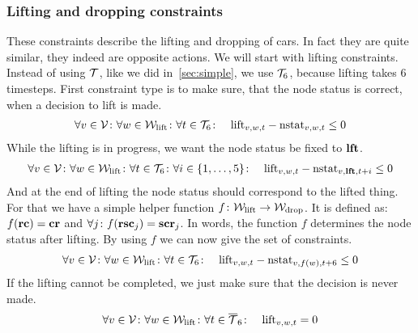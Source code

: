\subsubsection{Lifting and dropping constraints}
These constraints describe the lifting and dropping of cars. In fact they are
quite similar, they indeed are opposite actions. We will start with lifting
constraints. Instead of using $\mathcal{T}$, like we did in~\autoref{sec:simple}, we use
$\mathcal{T}_6$, because lifting takes 6 timesteps. First constraint type is to make sure,
that the node status is correct, when a decision to lift is made.
\begin{align}
    &\forall v \in \mathcal{V} \colon \forall w \in \mathcal{W}_\mathrm{lift} \colon \forall t \in \mathcal{T}_6 \colon
    &\mathrm{lift}_{v,w,t} - \mathrm{nstat}_{v,w,t} \leq 0
\end{align}
While the lifting is in progress, we want the node status be fixed to
$\text{\bf lft}$.
\begin{align}
    &\forall v \in \mathcal{V} \colon \forall w \in \mathcal{W}_\mathrm{lift} \colon \forall t \in \mathcal{T}_6 \colon
    \forall i \in \{1,\ldots,5\} \colon &\mathrm{lift}_{v,w,t} -
    \mathrm{nstat}_{v,\text{\bf lft},t+i} \leq 0
\end{align}
And at the end of lifting the node status should correspond to the lifted
thing. For that we have a simple helper function $f \colon \mathcal{W}_\mathrm{lift} \to \mathcal{W}_\mathrm{drop}$. It is
defined as: $f(\text{\bf rc}) = \text{\bf cr}$ and $\forall j \colon
f(\text{\bf rsc}_j) = \text{\bf scr}_j$. In words, the function $f$ determines the node
status after lifting. By using $f$ we can now give the set of constraints.
\begin{align}
    &\forall v \in \mathcal{V} \colon \forall w \in \mathcal{W}_\mathrm{lift} \colon \forall t \in \mathcal{T}_6 \colon
    &\mathrm{lift}_{v,w,t} - \mathrm{nstat}_{v,f(w),t+6} \leq 0
\end{align}
If the lifting cannot be completed, we just make sure that the decision is
never made.
\begin{align}
    &\forall v \in \mathcal{V} \colon \forall w \in \mathcal{W}_\mathrm{lift} \colon \forall t \in \overline{\mathcal{T}}_6
    \colon &\mathrm{lift}_{v,w,t} = 0
\end{align}

